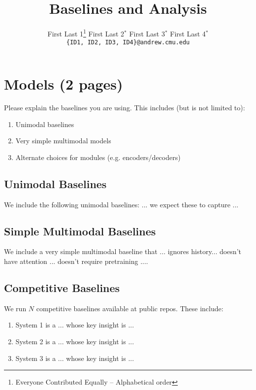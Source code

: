 \documentclass[11pt,a4paper]{article}
\title{Baselines and Analysis}
\author{
  First Last 1\thanks{\hspace{4pt}Everyone Contributed Equally -- Alphabetical order} \hspace{2em} First Last 2$^*$ \hspace{2em} First Last 3$^*$ \hspace{2em} First Last 4$^*$ \\
  \texttt{\{ID1, ID2, ID3, ID4\}@andrew.cmu.edu}
  }
\date{}
\begin{document}
\maketitle
\section{Models (2 pages)}
Please explain the baselines you are using. This includes (but is not limited to):
\begin{enumerate}
  \item Unimodal baselines
  \item Very simple multimodal models  
  \item Alternate choices for modules (e.g. encoders/decoders)
\end{enumerate}

\subsection{Unimodal Baselines}
We include the following unimodal baselines: ... we expect these to capture ...

\subsection{Simple Multimodal Baselines}
We include a very simple multimodal baseline that ... ignores history... doesn't have attention ... doesn't require pretraining ....

\subsection{Competitive Baselines}
We run $N$ competitive baselines available at public repos.  These include: 
\begin{enumerate}
  \item System 1 is a ... whose key insight is ... 
  \item System 2 is a ... whose key insight is ... 
  \item System 3 is a ... whose key insight is ... 
\end{enumerate}
\end{document}
